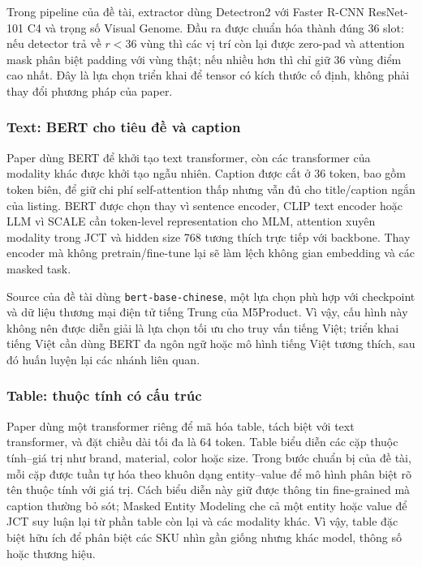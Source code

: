 \documentclass[10pt,conference]{IEEEtran}
\begin{document}
Trong pipeline của đề tài, extractor dùng Detectron2 với Faster R-CNN ResNet-101 C4 và trọng số Visual Genome. Đầu ra được chuẩn hóa thành đúng 36 slot: nếu detector trả về $r<36$ vùng thì các vị trí còn lại được zero-pad và attention mask phân biệt padding với vùng thật; nếu nhiều hơn thì chỉ giữ 36 vùng điểm cao nhất. Đây là lựa chọn triển khai để tensor có kích thước cố định, không phải thay đổi phương pháp của paper.

\subsubsection{Text: BERT cho tiêu đề và caption}

Paper dùng BERT để khởi tạo text transformer, còn các transformer của modality khác được khởi tạo ngẫu nhiên. Caption được cắt ở 36 token, bao gồm token biên, để giữ chi phí self-attention thấp nhưng vẫn đủ cho title/caption ngắn của listing. BERT được chọn thay vì sentence encoder, CLIP text encoder hoặc LLM vì SCALE cần token-level representation cho MLM, attention xuyên modality trong JCT và hidden size 768 tương thích trực tiếp với backbone. Thay encoder mà không pretrain/fine-tune lại sẽ làm lệch không gian embedding và các masked task.

Source của đề tài dùng \texttt{bert-base-chinese}, một lựa chọn phù hợp với checkpoint và dữ liệu thương mại điện tử tiếng Trung của M5Product. Vì vậy, cấu hình này không nên được diễn giải là lựa chọn tối ưu cho truy vấn tiếng Việt; triển khai tiếng Việt cần dùng BERT đa ngôn ngữ hoặc mô hình tiếng Việt tương thích, sau đó huấn luyện lại các nhánh liên quan.

\subsubsection{Table: thuộc tính có cấu trúc}

Paper dùng một transformer riêng để mã hóa table, tách biệt với text transformer, và đặt chiều dài tối đa là 64 token. Table biểu diễn các cặp thuộc tính--giá trị như brand, material, color hoặc size. Trong bước chuẩn bị của đề tài, mỗi cặp được tuần tự hóa theo khuôn dạng entity--value để mô hình phân biệt rõ tên thuộc tính với giá trị. Cách biểu diễn này giữ được thông tin fine-grained mà caption thường bỏ sót; Masked Entity Modeling che cả một entity hoặc value để JCT suy luận lại từ phần table còn lại và các modality khác. Vì vậy, table đặc biệt hữu ích để phân biệt các SKU nhìn gần giống nhưng khác model, thông số hoặc thương hiệu.
\end{document}
